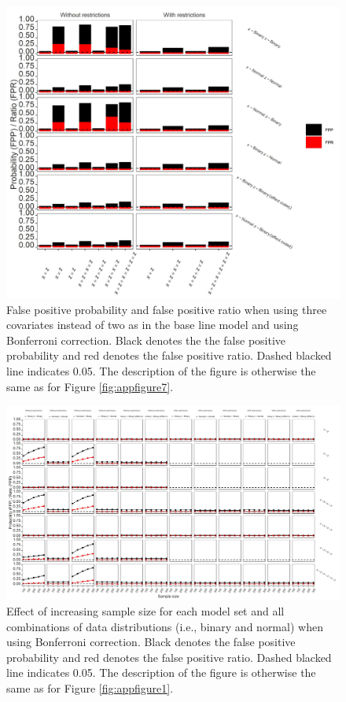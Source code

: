\begin{figure}[hbt!]
\includegraphics[scale=0.95]{R/Analysis/Result/Figures/Figure1CSIBon.jpeg}
\centering
\caption{False positive probability and false positive ratio when using three covariates instead of two as in the base line model and using Bonferroni correction. Black denotes the the false positive probability and red denotes the false positive ratio. Dashed blacked line indicates 0.05. The description of the figure is otherwise the same as for Figure \ref{fig:appfigure7}.
}
\label{fig:appfigure11}
\end{figure}


\begin{landscape}
\begin{figure}[hbt!]
\includegraphics[scale=0.75]{R/Analysis/Result/Figures/Figure1DSIBon.jpeg}
\centering
\caption{Effect of increasing sample size for each model set and all combinations of data distributions (i.e., binary and normal) when using Bonferroni correction. Black denotes the false positive probability and red denotes the false positive ratio. Dashed blacked line indicates 0.05. The description of the figure is otherwise the same as for Figure \ref{fig:appfigure1}.}
\label{fig:appfigure12}
\end{figure}
\end{landscape}
